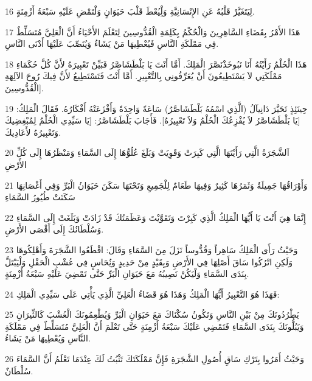 \par 16 لِيَتَغَيَّرْ قَلْبُهُ عَنِ الإِنْسَانِيَّةِ وَلِْيُعْطَ قَلْبَ حَيَوَانٍ وَلْتَمْضِ عَلَيْهِ سَبْعَةُ أَزْمِنَةٍ.
\par 17 هَذَا الأَمْرُ بِقَضَاءِ السَّاهِرِينَ وَالْحُكْمُ بِكَلِمَةِ الْقُدُّوسِينَ لِتَعْلَمَ الأَحْيَاءُ أَنَّ الْعَلِيَّ مُتَسَلِّطٌ فِي مَمْلَكَةِ النَّاسِ فَيُعْطِيهَا مَنْ يَشَاءُ وَيُنَصِّبَ عَلَيْهَا أَدْنَى النَّاسِ.
\par 18 هَذَا الْحُلْمُ رَأَيْتُهُ أَنَا نَبُوخَذْنَصَّرَ الْمَلِكَ. أَمَّا أَنْتَ يَا بَلْطَشَاصَّرُ فَبَيِّنْ تَعْبِيرَهُ لأَنَّ كُلَّ حُكَمَاءِ مَمْلَكَتِي لاَ يَسْتَطِيعُونَ أَنْ يُعَرِّفُونِي بِالتَّعْبِيرِ. أَمَّا أَنْتَ فَتَسْتَطِيعُ لأَنَّ فِيكَ رُوحَ الآلِهَةِ الْقُدُّوسِينَ].
\par 19 حِينَئِذٍ تَحَيَّرَ دَانِيآلُ (الَّذِي اسْمُهُ بَلْطَشَاصَّرُ) سَاعَةً وَاحِدَةً وَأَفْزَعَتْهُ أَفْكَارُهُ. فَقَالَ الْمَلِكُ: [يَا بَلْطَشَاصَّرُ لاَ يُفْزِعُكَ الْحُلْمُ وَلاَ تَعْبِيرُهُ]. فَأَجَابَ بَلْطَشَاصَّرُ: [يَا سَيِّدِي الْحُلْمُ لِمُبْغِضِيكَ وَتَعْبِيرُهُ لأَعَادِيكَ.
\par 20 اَلشَّجَرَةُ الَّتِي رَأَيْتَهَا الَّتِي كَبِرَتْ وَقَوِيَتْ وَبَلَغَ عُلُوُّهَا إِلَى السَّمَاءِ وَمَنْظَرُهَا إِلَى كُلِّ الأَرْضِ
\par 21 وَأَوْرَاقُهَا جَمِيلَةٌ وَثَمَرُهَا كَثِيرٌ وَفِيهَا طَعَامٌ لِلْجَمِيعِ وَتَحْتَهَا سَكَنَ حَيَوَانُ الْبَرِّ وَفِي أَغْصَانِهَا سَكَنَتْ طُيُورُ السَّمَاءِ
\par 22 إِنَّمَا هِيَ أَنْتَ يَا أَيُّهَا الْمَلِكُ الَّذِي كَبِرْتَ وَتَقَوَّيْتَ وَعَظَمَتُكَ قَدْ زَادَتْ وَبَلَغَتْ إِلَى السَّمَاءِ وَسُلْطَانُكَ إِلَى أَقْصَى الأَرْضِ.
\par 23 وَحَيْثُ رَأَى الْمَلِكُ سَاهِراً وَقُدُّوساً نَزَلَ مِنَ السَّمَاءِ وَقَالَ: اقْطَعُوا الشَّجَرَةَ وَأَهْلِكُوهَا وَلَكِنِ اتْرُكُوا سَاقَ أَصْلِهَا فِي الأَرْضِ وَبِقَيْدٍ مِنْ حَدِيدٍ وَنُِحَاسٍ فِي عُشْبِ الْحَقْلِ وَلْيَبْتَلَّ بِنَدَى السَّمَاءِ وَلْيَكُنْ نَصِيبُهُ مَعَ حَيَوَانِ الْبَرِّ حَتَّى تَمْضِيَ عَلَيْهِ سَبْعَةُ أَزْمِنَةٍ.
\par 24 فَهَذَا هُوَ التَّعْبِيرُ أَيُّهَا الْمَلِكُ وَهَذَا هُوَ قَضَاءُ الْعَلِيِّ الَّذِي يَأْتِي عَلَى سَيِّدِي الْمَلِكِ:
\par 25 يَطْرُدُونَكَ مِنْ بَيْنِ النَّاسِ وَتَكُونُ سُكْنَاكَ مَعَ حَيَوَانِ الْبَرِّ وَيُطْعِمُونَكَ الْعُشْبَ كَالثِّيرَانِ وَيَبُلُّونَكَ بِنَدَى السَّمَاءِ فَتَمْضِي عَلَيْكَ سَبْعَةُ أَزْمِنَةٍ حَتَّى تَعْلَمَ أَنَّ الْعَلِيَّ مُتَسَلِّطٌ فِي مَمْلَكَةِ النَّاسِ وَيُعْطِيهَا مَنْ يَشَاءُ.
\par 26 وَحَيْثُ أَمَرُوا بِتَرْكِ سَاقِ أُصُولِ الشَّجَرَةِ فَإِنَّ مَمْلَكَتَكَ تَثْبُتُ لَكَ عِنْدَمَا تَعْلَمُ أَنَّ السَّمَاءَ سُلْطَانٌ.
